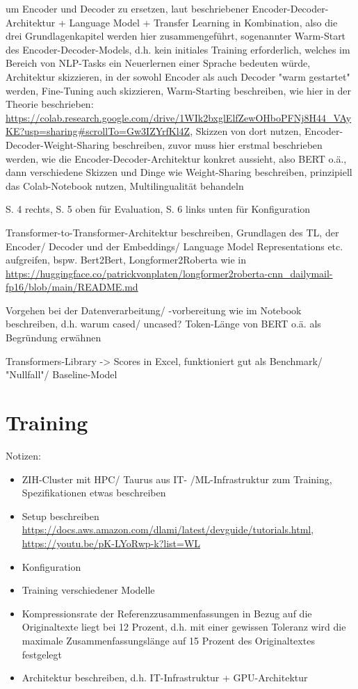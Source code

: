 \cite{ROT20} um Encoder und Decoder zu ersetzen, laut beschriebener Encoder-Decoder-Architektur + Language Model + Transfer Learning in Kombination, also die drei Grundlagenkapitel werden hier zusammengeführt, sogenannter Warm-Start des Encoder-Decoder-Models, d.h. kein initiales Training erforderlich, welches im Bereich von NLP-Tasks ein Neuerlernen einer Sprache bedeuten würde, Architektur skizzieren, in der sowohl Encoder als auch Decoder "warm gestartet" werden, Fine-Tuning auch skizzieren, Warm-Starting beschreiben, wie hier in der Theorie beschrieben: \url{https://colab.research.google.com/drive/1WIk2bxglElfZewOHboPFNj8H44_VAyKE?usp=sharing#scrollTo=Gw3IZYrfKl4Z}, Skizzen von dort nutzen, Encoder-Decoder-Weight-Sharing beschreiben, zuvor muss hier erstmal beschrieben werden, wie die Encoder-Decoder-Architektur konkret aussieht, also BERT o.ä., dann verschiedene Skizzen und Dinge wie Weight-Sharing beschreiben, prinzipiell das Colab-Notebook nutzen, Multilingualität behandeln

\cite{YAN19} S. 4 rechts, S. 5 oben für Evaluation, S. 6 links unten für Konfiguration

Transformer-to-Transformer-Architektur beschreiben, Grundlagen des TL, der Encoder/ Decoder und der Embeddings/ Language Model Representations etc. aufgreifen, bspw. Bert2Bert, Longformer2Roberta wie in \url{https://huggingface.co/patrickvonplaten/longformer2roberta-cnn_dailymail-fp16/blob/main/README.md}

Vorgehen bei der Datenverarbeitung/ -vorbereitung wie im Notebook beschreiben, d.h. warum cased/ uncased? Token-Länge von BERT o.ä. als Begründung erwähnen

Transformers-Library -> Scores in Excel, funktioniert gut als Benchmark/ "Nullfall"/ Baseline-Model


\section{Training}
Notizen:
\begin{itemize}
	\item ZIH-Cluster mit HPC/ Taurus aus IT- /ML-Infrastruktur zum Training, Spezifikationen etwas beschreiben
	\item Setup beschreiben \url{https://docs.aws.amazon.com/dlami/latest/devguide/tutorials.html}, \url{https://youtu.be/pK-LYoRwp-k?list=WL}
	\item Konfiguration
	\item Training verschiedener Modelle
	\item Kompressionsrate der Referenzzusammenfassungen in Bezug auf die Originaltexte liegt bei 12 Prozent, d.h. mit einer gewissen Toleranz wird die maximale Zusammenfassungslänge auf 15 Prozent des Originaltextes festgelegt
	\item Architektur beschreiben, d.h. IT-Infrastruktur + GPU-Architektur
\end{itemize}


